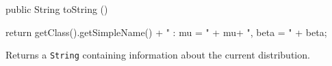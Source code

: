 \begin{hide}\begin{code}

   public String toString ()\begin{hide} {
      return getClass().getSimpleName() + " : mu = " + mu+ ", beta = " + beta;
   }\end{hide}
\end{code}
\begin{tabb}
Returns a \texttt{String} containing information about the current distribution.
\end{tabb}\end{hide}
\begin{code}\begin{hide}
}\end{hide}
\end{code}
